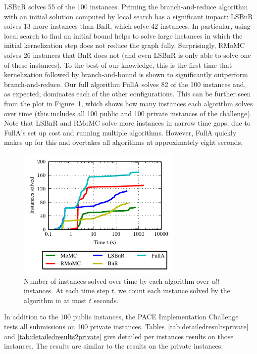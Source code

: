 \documentclass[twoside,leqno,twocolumn]{article}
\newcommand{\AlgName}[1]{\textsf{#1}}
\begin{document}
\AlgName{LSBnR} solves 55 of the 100 instances. Priming the branch-and-reduce algorithm with an initial solution computed by local search has a significant impact: \AlgName{LSBnR} solves 13 more instances than \AlgName{BnR}, which solve 42 instances. In particular, using local search to find an initial bound helps to solve large instances in which the initial kernelization step does not reduce the graph fully. Surprisingly, \AlgName{RMoMC} solves 26 instances that \AlgName{BnR} does not (and even \AlgName{LSBnR} is only able to solve one of these instances). To the best of our knowledge, this is the first time that kernelization followed by branch-and-bound is shown to significantly outperform branch-and-reduce. Our full algorithm \AlgName{FullA} solves 82 of the 100 instances and, as expected, dominates each of the other configurations. This can be further seen from the plot in Figure~\ref{fig:solution_time}, which shows how many instances each algorithm solves over time (this includes all 100 public and 100 private instances of the challenge). Note that \AlgName{LSBnR} and \AlgName{RMoMC} solve more instances in narrow time gaps, due to \AlgName{FullA}'s set up cost and  running multiple algorithms. However, \AlgName{FullA} quickly makes up for this and overtakes all algorithms at approximately eight seconds.
\begin{figure}
    \centering
    \includegraphics[width=8cm]{plots/rt_solutions_all.pdf}
  \caption{Number of instances solved over time by each algorithm over \emph{all} instances. At each time step $t$, we count each instance solved by the algorithm in at most $t$ seconds.} 
  \vspace*{-.5cm}
  \label{fig:solution_time}
\end{figure}
In addition to the 100 public instances, the PACE Implementation Challenge tests all submissions on 100 private instances. Tables~\ref{tab:detailedresultsprivate} and \ref{tab:detailedresults2private} give detailed per instances results on those instances. The results are similar to the results on the private instances. %
\end{document}
